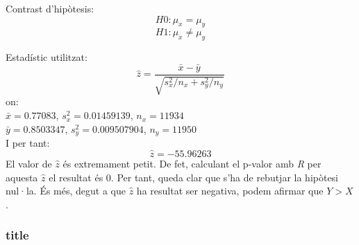 Contrast d'hipòtesis:
$$H0: \mu_x = \mu_y$$
$$H1: \mu_x \neq \mu_y$$

Estadístic utilitzat:
$$\hat{z} = \frac{\bar{x} - \bar{y}}{\sqrt{s_x^2/n_x + s_y^2/n_y}} $$
on: \\
$\bar{x} = 0.77083$,
$s^2_x = 0.01459139$,
$n_x = 11934$ \\
$\bar{y} = 0.8503347$,
$s^2_y = 0.009507904$,
$n_y = 11950$
\\

I per tant:
$$\hat{z} = -55.96263$$
El valor de $\hat{z}$ és extremament petit. De fet, calculant el p-valor amb \emph{R} per aquesta $\hat{z}$ el resultat és 0. Per tant, queda clar que s'ha de rebutjar la hipòtesi nul·la. És més, degut a que $\hat{z}$ ha resultat ser negativa, podem afirmar que $Y>X$.

\subsubsection{title}
